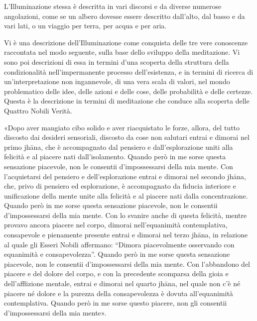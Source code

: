 
 L’Illuminazione stessa è descritta in vari discorsi
e da diverse numerose angolazioni, come se un albero dovesse essere descritto
dall’alto, dal basso e da vari lati, o un viaggio per terra, per acqua e per
aria.

 Vi è una descrizione dell’Illuminazione come
conquista delle tre vere conoscenze raccontata nel modo seguente, sulla base
dello sviluppo della meditazione. Vi sono poi descrizioni di essa in termini
d’una scoperta della struttura della condizionalità nell’impermanente processo
dell’esistenza, e in termini di ricerca di un’interpretazione non ingannevole,
di una vera scala di valori, nel mondo problematico delle idee, delle azioni e
delle cose, delle probabilità e delle certezze. Questa è la descrizione in
termini di meditazione che conduce alla scoperta delle Quattro Nobili Verità.

\label{pag27}%
 «Dopo aver mangiato cibo solido e aver riacquistato le
forze, allora, del tutto discosto dai desideri sensoriali, discosto da cose non
salutari entrai e dimorai nel primo jhāna, che è accompagnato dal pensiero e
dall’esplorazione uniti alla felicità e al piacere nati dall’isolamento. Quando
però in me sorse questa sensazione piacevole, non le consentii d’impossessarsi
della mia mente. Con l’acquietarsi del pensiero e dell’esplorazione entrai e
dimorai nel secondo jhāna, che, privo di pensiero ed esplorazione, è
accompagnato da fiducia interiore e unificazione della mente unite alla felicità
e al piacere nati dalla concentrazione. Quando però in me sorse questa
sensazione piacevole, non le consentii d’impossessarsi della mia mente. Con lo
svanire anche di questa felicità, mentre provavo ancora piacere nel corpo,
dimorai nell’equanimità contemplativa, consapevole e pienamente presente entrai
e dimorai nel terzo jhāna, in relazione al quale gli Esseri Nobili affermano:
“Dimora piacevolmente osservando con equanimità e consapevolezza”. Quando però
in me sorse questa sensazione piacevole, non le consentii d’impossessarsi della
mia mente. Con l’abbandono del piacere e del dolore del corpo, e con la
precedente scomparsa della gioia e dell’afflizione mentale, entrai e dimorai nel
quarto jhāna, nel quale non c’è né piacere né dolore e la purezza della
consapevolezza è dovuta all’equanimità contemplativa. Quando però in me sorse
questo piacere, non gli consentii d’impossessarsi della mia mente».

